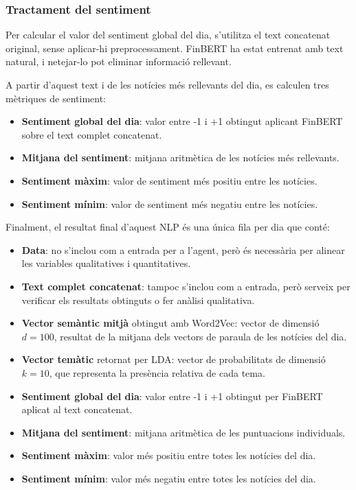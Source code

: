 \documentclass[12pt,a4paper,twoside]{book}
\begin{document}
\subsubsection{Tractament del sentiment}

Per calcular el valor del sentiment global del dia, s'utilitza el text concatenat original, sense aplicar-hi preprocessament. FinBERT ha estat entrenat amb text natural, i netejar-lo pot eliminar informació rellevant.

A partir d'aquest text i de les notícies més rellevants del dia, es calculen tres mètriques de sentiment:

\begin{itemize}
    \item \textbf{Sentiment global del dia}: valor entre -1 i +1 obtingut aplicant FinBERT sobre el text complet concatenat.
    \item \textbf{Mitjana del sentiment}: mitjana aritmètica de les notícies més rellevants.
    \item \textbf{Sentiment màxim}: valor de sentiment més positiu entre les notícies.
    \item \textbf{Sentiment mínim}: valor de sentiment més negatiu entre les notícies.
\end{itemize}

Finalment, el resultat final d'aquest NLP és una única fila per dia que conté:

\begin{itemize}
    \item \textbf{Data}: no s'inclou com a entrada per a l'agent, però és necessària per alinear les variables qualitatives i quantitatives.

    \item \textbf{Text complet concatenat}: tampoc s'inclou com a entrada, però serveix per verificar els resultats obtinguts o fer anàlisi qualitativa.

    \item \textbf{Vector semàntic mitjà} obtingut amb Word2Vec: vector de dimensió $d=100$, resultat de la mitjana dels vectors de paraula de les notícies del dia.

    \item \textbf{Vector temàtic} retornat per LDA: vector de probabilitats de dimensió $k=10$, que representa la presència relativa de cada tema.

    \item \textbf{Sentiment global del dia}: valor entre -1 i +1 obtingut per FinBERT aplicat al text concatenat.

    \item \textbf{Mitjana del sentiment}: mitjana aritmètica de les puntuacions individuals.

    \item \textbf{Sentiment màxim}: valor més positiu entre totes les notícies del dia.

    \item \textbf{Sentiment mínim}: valor més negatiu entre totes les notícies del dia.
\end{itemize}
\end{document}
